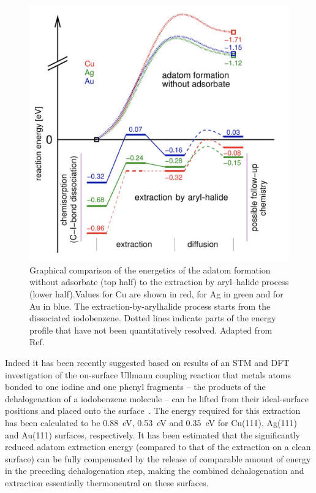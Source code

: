\documentclass[journal=jacsat,manuscript=article]{achemso}
\newcommand{\lock}{\color{red}}
\newcommand{\lock}{\color{black}}
\begin{document}
\begin{figure}[htb]
\centering
\includegraphics[width=0.75\columnwidth]{Fig/Adatom-formation.png}
\caption{Graphical comparison of the energetics of the adatom formation without adsorbate (top half) to the extraction by aryl–halide process (lower half).Values for Cu are shown in red, for Ag in green and for Au in blue. The extraction-by-arylhalide process starts from the dissociated iodobenzene. Dotted lines indicate parts of the energy profile that have not been quantitatively resolved. Adapted from Ref.~\cite{chemeurope2017}}
\label{fig:3}
\end{figure}

\fi

{\lock

Indeed it has been recently suggested based on results of an STM and DFT investigation of the on-surface Ullmann coupling reaction that metals atoms bonded to one iodine and one phenyl fragments -- the products of the dehalogenation of a iodobenzene molecule -- can be lifted from their ideal-surface positions and placed onto the surface~\cite{chemeurope2017}. 
%
The energy required for this extraction has been calculated to be \SI{0.88}{\electronvolt}, \SI{0.53}{\electronvolt} and \SI{0.35}{\electronvolt} for Cu(111), Ag(111) and Au(111) surfaces, respectively. %
%
It has been estimated that the significantly reduced adatom extraction energy (compared to that of the extraction on a clean surface) can be fully compensated by the release of comparable amount of energy in the preceding dehalogenation step, making the combined dehalogenation and extraction essentially thermoneutral on these surfaces.

}
\end{document}
